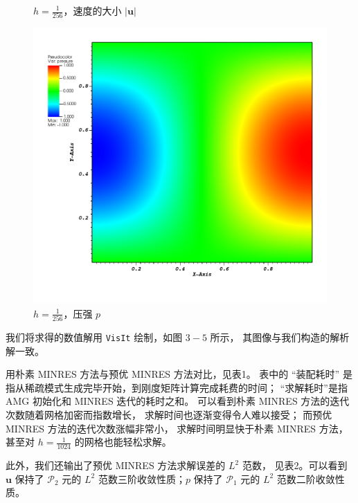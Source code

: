 \documentclass[lang=cn,11pt,a4paper]{elegantpaper}
\begin{document}
\begin{figure}[H]
\begin{minipage}[t]{0.32\textwidth}
        \caption{\small $h=\frac{1}{256}$，速度的大小 $|\mathbf{u}|$}
    \end{minipage}
    \hfill
    \begin{minipage}[t]{0.32\textwidth}
        \centering
        \includegraphics[width=\linewidth]{fig/pressure.png}
        \caption{\small $h=\frac{1}{256}$，压强 $p$}
    \end{minipage}
\end{figure}

我们将求得的数值解用 \verb|VisIt| 绘制，如图 $3-5$ 所示，
其图像与我们构造的解析解一致。

用朴素 MINRES 方法与预优 MINRES 方法对比，见表1。
表中的 “装配耗时” 是指从稀疏模式生成完毕开始，到刚度矩阵计算完成耗费的时间；
“求解耗时”是指 AMG 初始化和 MINRES 迭代的耗时之和。
可以看到朴素 MINRES 方法的迭代次数随着网格加密而指数增长，
求解时间也逐渐变得令人难以接受；
而预优 MINRES 方法的迭代次数涨幅非常小，
求解时间明显快于朴素 MINRES 方法，
甚至对 $h=\frac{1}{1024}$ 的网格也能轻松求解。

此外，我们还输出了预优 MINRES 方法求解误差的 $L^2$ 范数，
见表2。可以看到 $\mathbf{u}$ 保持了 $\mathcal{P}_2$ 元的
$L^2$ 范数三阶收敛性质；$p$ 保持了 $\mathcal{P}_1$ 元的
$L^2$ 范数二阶收敛性质。
\end{document}

